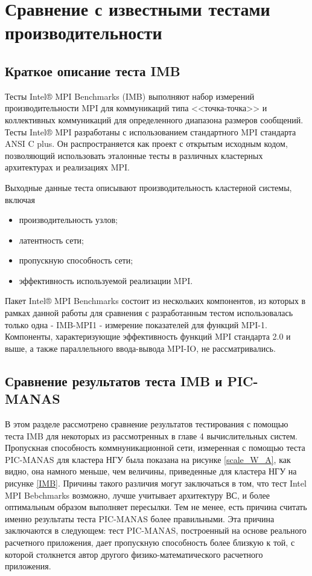 \section{Сравнение с известными тестами производительности}

\subsection{Краткое описание теста IMB}

Тесты Intel® MPI Benchmarks (IMB) \cite{IMB} выполняют набор измерений производительности MPI для коммуникаций типа <<точка-точка>> и коллективных коммуникаций для определенного диапазона размеров сообщений. Тесты Intel® MPI разработаны с использованием стандартного MPI стандарта ANSI C plus. Он распространяется как проект с открытым исходным кодом, позволяющий использовать эталонные тесты в различных кластерных архитектурах и реализациях MPI.

Выходные данные теста описывают производительность кластерной системы, включая 
\begin{itemize}
	\item производительность узлов; 
	\item латентность сети;
	\item пропускную способность сети;
	\item эффективность используемой реализации MPI.
\end{itemize}

Пакет Intel® MPI Benchmarks состоит из нескольких компонентов, из которых в рамках данной работы для сравнения с разработанным тестом использовалась только одна - IMB-MPI1 - измерение показателей для функций MPI-1. Компоненты, характеризующие эффективность функций MPI стандарта 2.0 и выше, а также параллельного ввода-вывода MPI-IO, не рассматривались.

\subsection{Сравнение результатов теста IMB и PIC-MANAS} 

В этом разделе рассмотрено сравнение результатов тестирования с помощью теста IMB для некоторых из рассмотренных в главе 4 вычислительных систем. Пропускная способность коммнуникационной сети, измеренная с помощью теста PIC-MANAS для кластера НГУ была показана на рисунке \ref{scale_W_A}, как видно, она намного меньше, чем величины, приведенные для кластера НГУ на рисунке \ref{IMB}.
Причины такого различия могут заключаться в том, что тест Intel MPI Bebchmarks  возможно, лучше учитывает архитектуру ВС, и более оптимальным образом выполняет пересылки. Тем не менее, есть причина считать именно результаты теста PIC-MANAS более правильными. Эта причина заключаются в следующем: тест PIC-MANAS, построенный на основе реального расчетного приложения, дает пропускную способность более близкую к той, с которой столкнется автор другого физико-математического расчетного приложения.  


